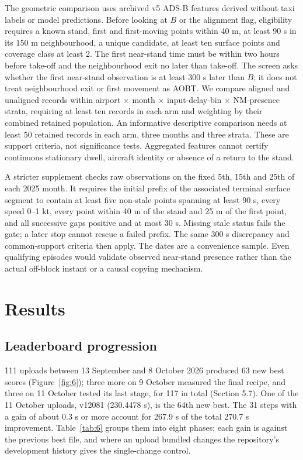 \documentclass[11pt,a4paper]{article}
\begin{document}
The geometric comparison uses archived v5 ADS-B features derived without taxi labels or model predictions. Before looking at \(B\) or the alignment flag, eligibility requires a known stand, first and first-moving points within 40 m, at least 90 s in its 150 m neighbourhood, a unique candidate, at least ten surface points and coverage class at least 2. The first near-stand time must be within two hours before take-off and the neighbourhood exit no later than take-off. The screen asks whether the first near-stand observation is at least 300 s later than \(B\); it does not treat neighbourhood exit or first movement as AOBT. We compare aligned and unaligned records within airport $\times$ month $\times$ input-delay-bin $\times$ NM-presence strata, requiring at least ten records in each arm and weighting by their combined retained population. An informative descriptive comparison needs at least 50 retained records in each arm, three months and three strata. These are support criteria, not significance tests. Aggregated features cannot certify continuous stationary dwell, aircraft identity or absence of a return to the stand.

A stricter supplement checks raw observations on the fixed 5th, 15th and 25th of each 2025 month. It requires the initial prefix of the associated terminal surface segment to contain at least five non-stale points spanning at least 90 s, every speed 0--1 kt, every point within 40 m of the stand and 25 m of the first point, and all successive gaps positive and at most 30 s. Missing stale status fails the gate; a later stop cannot rescue a failed prefix. The same 300 s discrepancy and common-support criteria then apply. The dates are a convenience sample. Even qualifying episodes would validate observed near-stand presence rather than the actual off-block instant or a causal copying mechanism.

\section{Results}\label{results}

\subsection{Leaderboard progression}\label{leaderboard-progression}

111 uploads between 13 September and 8 October 2026 produced 63 new best scores (Figure~\ref{fig:6}); three more on 9 October measured the final recipe, and three on 11 October tested its last stage, for 117 in total (Section 5.7). One of the 11 October uploads, v12081 (230.4478 s), is the 64th new best. The 31 steps with a gain of about 0.3 s or more account for 267.9 s of the total 270.7 s improvement. Table~\ref{tab:6} groups them into eight phases; each gain is against the previous best file, and where an upload bundled changes the repository's development history gives the single-change control.
\end{document}
